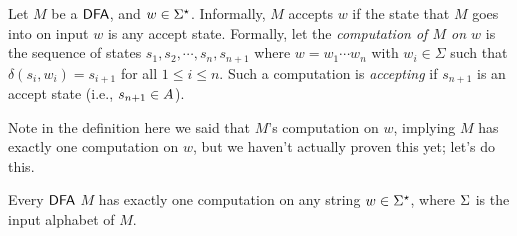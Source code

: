 Let $M$ be a $\textsf{DFA}$, and $w \in \Sigma^\star$. Informally, $M$ accepts $w$ if the state that $M$ goes into on input $w$ is any accept state.
Formally, let the \textit{computation of $M$ on $w$} is the sequence of states $s_1, s_2, \cdots, s_n, s_{n+1}$ where $w = w_1 \cdots w_n$ with $w_i \in \Sigma$ such that $\delta(s_i, w_i) = s_{i+1}$ for all $1 \le i \le n$.
Such a computation is \textit{accepting} if $s_{n+1}$ is an accept state (i.e., $s_{n+1} \in A$).

Note in the definition here we said that $M$'s computation on $w$, implying $M$ has exactly one computation on $w$, but we haven't actually proven this yet; let's do this.

\begin{claim*}
	Every $\textsf{DFA}$ $M$ has exactly one computation on any string $w \in \Sigma^\star$, where $\Sigma$ is the input alphabet of $M$.
\end{claim*}

